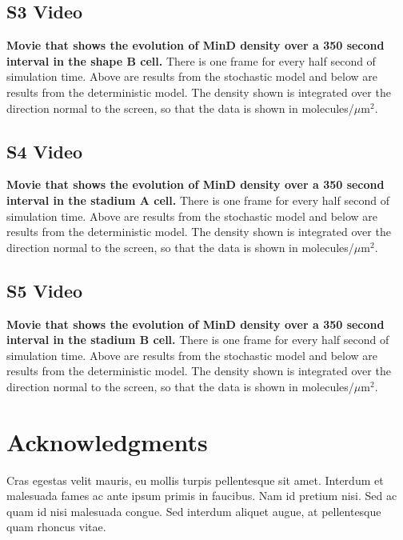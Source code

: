 \documentclass[10pt,letterpaper]{article}
\newcommand\micron{\ensuremath{\mu\text{m}}}
\begin{document}
\subsection*{S3 Video}
\label{movie-MinD-density-shape-B}
{\bf Movie that shows the evolution of MinD density over a 350 second
  interval in the shape B cell.}  There is one frame for every half
second of simulation time. Above are results from the stochastic model
and below are results from the deterministic model.  The density shown
is integrated over the direction normal to the screen, so that the
data is shown in molecules/$\micron^2$.

\subsection*{S4 Video}
\label{movie-MinD-density-stadium-A}
{\bf Movie that shows the evolution of MinD density over a 350 second
  interval in the stadium A cell.}  There is one frame for every half
second of simulation time. Above are results from the stochastic model
and below are results from the deterministic model.  The density shown
is integrated over the direction normal to the screen, so that the
data is shown in molecules/$\micron^2$.

\subsection*{S5 Video}
\label{movie-MinD-density-stadium-B}
{\bf Movie that shows the evolution of MinD density over a 350 second
  interval in the stadium B cell.}  There is one frame for every half
second of simulation time. Above are results from the stochastic model
and below are results from the deterministic model.  The density shown
is integrated over the direction normal to the screen, so that the
data is shown in molecules/$\micron^2$.

\section*{Acknowledgments}
Cras egestas velit mauris, eu mollis turpis pellentesque sit
amet. Interdum et malesuada fames ac ante ipsum primis in
faucibus. Nam id pretium nisi. Sed ac quam id nisi malesuada
congue. Sed interdum aliquet augue, at pellentesque quam rhoncus
vitae.

\nolinenumbers



\end{document}
